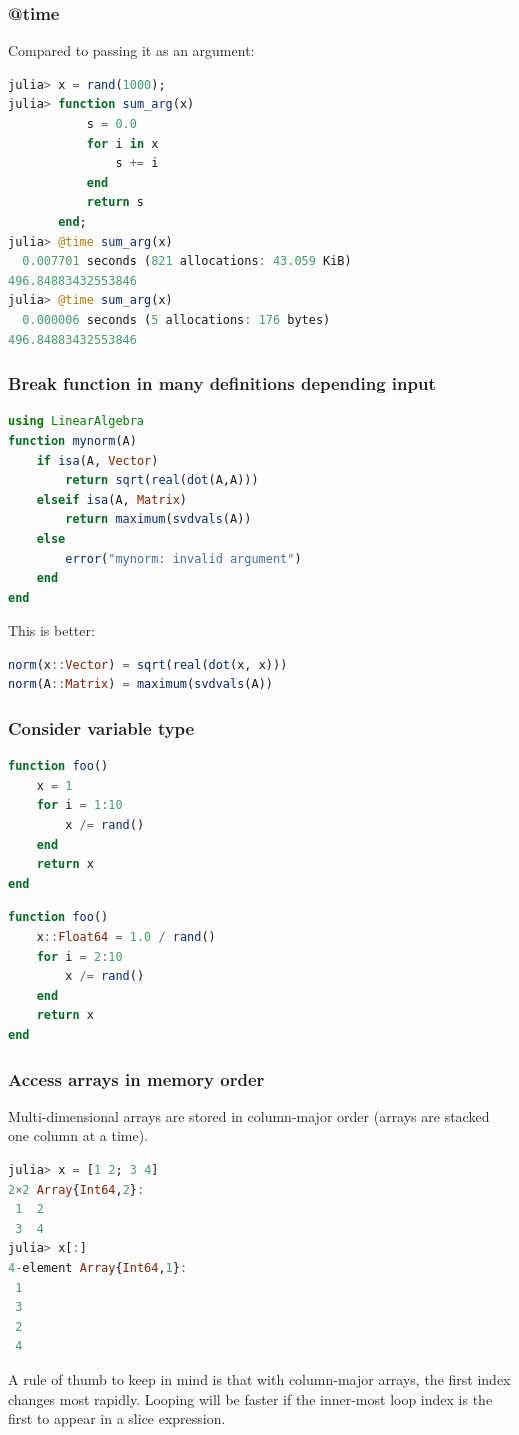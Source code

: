 \documentclass{beamer}
\begin{document}
\begin{frame}[fragile]
\frametitle{@time}
Compared to passing it as an argument:

\begin{lstlisting}[language=julia]
julia> x = rand(1000);
julia> function sum_arg(x)
           s = 0.0
           for i in x
               s += i
           end
           return s
       end;
julia> @time sum_arg(x)
  0.007701 seconds (821 allocations: 43.059 KiB)
496.84883432553846
julia> @time sum_arg(x)
  0.000006 seconds (5 allocations: 176 bytes)
496.84883432553846
\end{lstlisting}
\end{frame}

\begin{frame}[fragile]
\frametitle{Break function in many definitions depending input}
\begin{lstlisting}[language=julia]
using LinearAlgebra
function mynorm(A)
    if isa(A, Vector)
        return sqrt(real(dot(A,A)))
    elseif isa(A, Matrix)
        return maximum(svdvals(A))
    else
        error("mynorm: invalid argument")
    end
end
\end{lstlisting}
This is better:
\begin{lstlisting}[language=julia]
norm(x::Vector) = sqrt(real(dot(x, x)))
norm(A::Matrix) = maximum(svdvals(A))
\end{lstlisting}
\end{frame}

\begin{frame}[fragile]
\frametitle{Consider variable type}
\begin{lstlisting}[language=julia]
function foo()
    x = 1
    for i = 1:10
        x /= rand()
    end
    return x
end
\end{lstlisting}
\begin{lstlisting}[language=julia]
function foo()
    x::Float64 = 1.0 / rand()
    for i = 2:10
        x /= rand()
    end
    return x
end
\end{lstlisting}
\end{frame}

\begin{frame}[fragile]
\frametitle{Access arrays in memory order}
Multi-dimensional arrays are stored in column-major order (arrays are stacked one column at a time).
\begin{lstlisting}[language=julia]
julia> x = [1 2; 3 4]
2×2 Array{Int64,2}:
 1  2
 3  4
julia> x[:]
4-element Array{Int64,1}:
 1
 3
 2
 4
\end{lstlisting}
A rule of thumb to keep in mind is that with column-major arrays, the first index changes most rapidly. Looping will be faster if the inner-most loop index is the first to appear in a slice expression. 
\end{frame}
\end{document}
